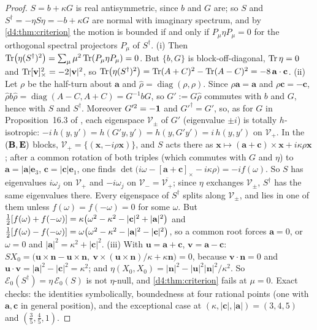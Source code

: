 \begin{proof}
$S=b+\kappa G$ is real antisymmetric, since $b$ and $G$ are; so $S$ and $S^\dagger=-\eta S\eta=-b+\kappa G$ are normal with imaginary spectrum, and
by \cref{d4:thm:criterion} the motion is bounded if and only if $P_\mu\eta P_\mu=0$ for the orthogonal spectral projectors $P_\mu$ of $S^\dagger$.
(i) Then $\operatorname{Tr}\bigl(\eta(S^\dagger)^2\bigr)=\sum_\mu\mu^2\operatorname{Tr}(P_\mu\eta P_\mu)=0$. But $\{b,G\}$ is block-off-diagonal, $\operatorname{Tr}\eta=0$ and $\operatorname{Tr}[\mathbf v]_\times^2=-2|\mathbf v|^2$,
so $\operatorname{Tr}\bigl(\eta(S^\dagger)^2\bigr)=\operatorname{Tr}(A+C)^2-\operatorname{Tr}(A-C)^2=-8\,\mathbf a\cdot\mathbf c$. (ii) Let $\rho$ be the half-turn about $\mathbf a$ and $\hat\rho=\operatorname{diag}(\rho,\rho)$. Since $\rho\mathbf a=\mathbf a$ and $\rho\mathbf c=-\mathbf c$,
$\hat\rho b\hat\rho=\operatorname{diag}(A-C,A+C)=G^{-1}bG$, so $G':=G\hat\rho$ commutes with $b$ and $G$, hence with $S$ and $S^\dagger$. Moreover $G'^2=-\mathbf 1$
and $G'^\dagger=G'$, so, as for $G$ in Proposition~16.3 of \cite{ES17}, each eigenspace $\mathcal V_\pm$ of $G'$ (eigenvalue $\pm i$) is totally
$h$-isotropic: $-i\,h(y,y')=h(G'y,y')=h(y,G'y')=i\,h(y,y')$ on $\mathcal V_+$. In the $(\mathbf B,\mathbf E)$ blocks, $\mathcal V_+=\{(\mathbf x,-i\rho\mathbf x)\}$, and $S$ acts
there as $\mathbf x\mapsto(\mathbf a+\mathbf c)\times\mathbf x+i\kappa\rho\mathbf x$; after a common rotation of both triples (which commutes with $G$ and
$\eta$) to $\mathbf a=|\mathbf a|\mathbf e_3$, $\mathbf c=|\mathbf c|\mathbf e_1$, one finds $\det\bigl(i\omega-[\mathbf a+\mathbf c]_\times-i\kappa\rho\bigr)=-i f(\omega)$. So
$S$ has eigenvalues $i\omega_j$ on $\mathcal V_+$ and $-i\omega_j$ on $\mathcal V_-=\overline{\mathcal V_+}$; since $\eta$ exchanges $\mathcal V_\pm$, $S^\dagger$ has the
same eigenvalues there. Every eigenspace of $S^\dagger$ splits along $\mathcal V_\pm$, and lies in one of them unless $f(\omega)=f(-\omega)=0$ for some $\omega$.
But $\tfrac12[f(\omega)+f(-\omega)]=\kappa\bigl(\omega^2-\kappa^2-|\mathbf c|^2+|\mathbf a|^2\bigr)$ and $\tfrac12[f(\omega)-f(-\omega)]=\omega\bigl(\omega^2-\kappa^2-|\mathbf a|^2-|\mathbf c|^2\bigr)$,
so a common root forces $\mathbf a=0$, or $\omega=0$ and $|\mathbf a|^2=\kappa^2+|\mathbf c|^2$. (iii) With $\mathbf u=\mathbf a+\mathbf c$, $\mathbf v=\mathbf a-\mathbf c$: $SX_0=\bigl(\mathbf u\times\mathbf n-\mathbf u\times\mathbf n,\ \mathbf v\times(\mathbf u\times\mathbf n)/\kappa+\kappa\mathbf n\bigr)=0$,
because $\mathbf v\cdot\mathbf n=0$ and $\mathbf u\cdot\mathbf v=|\mathbf a|^2-|\mathbf c|^2=\kappa^2$; and $\eta(X_0,X_0)=|\mathbf n|^2-|\mathbf u|^2|\mathbf n|^2/\kappa^2$. So
$\mathcal E_0(S^\dagger)=\eta\,\mathcal E_0(S)$ is not $\eta$-null, and \cref{d4:thm:criterion} fails at $\mu=0$. Exact checks: the identities symbolically,
boundedness at four rational points (one with $\mathbf a,\mathbf c$ in general position), and the exceptional case at
$(\kappa,|\mathbf c|,|\mathbf a|)=(3,4,5)$ and $(\tfrac35,\tfrac45,1)$.
\end{proof}

